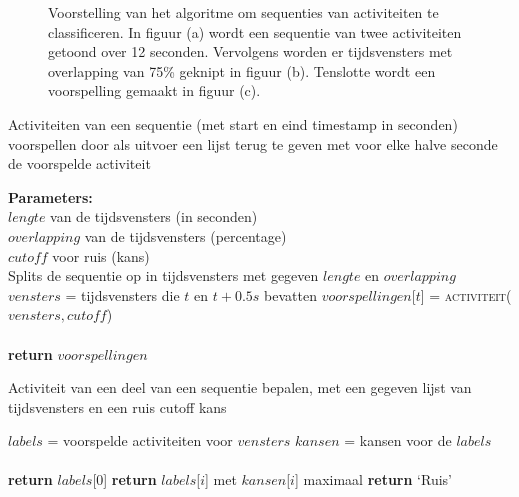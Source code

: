 \documentclass{article}
\begin{document}
\begin{figure}[h]
\begin{subfigure}[b]{.90\linewidth}
\end{subfigure}
  \caption{Voorstelling van het algoritme om sequenties van activiteiten te classificeren. In figuur (a) wordt een sequentie van twee activiteiten getoond over 12 seconden. Vervolgens worden er tijdsvensters met overlapping van 75\% geknipt in figuur (b). Tenslotte wordt een voorspelling gemaakt in figuur (c).}\label{fig:algoritme}

\end{figure}


\begin{algorithm}
  \caption{Activiteiten van een sequentie (met start en eind timestamp in seconden) voorspellen door als uitvoer een lijst terug te geven met voor elke halve seconde de voorspelde activiteit}
  \label{alg:sequentie}
  \begin{algorithmic}[0]
    \State \textbf{Parameters:}\\
    $lengte$ van de tijdsvensters (in seconden) \\
    $overlapping$ van de tijdsvensters (percentage) \\
    $cutoff$ voor ruis (kans) \\
    \State Splits de sequentie op in tijdsvensters met gegeven $lengte$ en $overlapping$ \\
      \State $vensters$ = tijdsvensters die $t$ en $t+0.5s$ bevatten
      \State $voorspellingen$[$t$] = \textsc{activiteit}($vensters,cutoff$) \\
    \EndFor \\
    \State \textbf{return} $voorspellingen$
  \end{algorithmic}
\end{algorithm}

\begin{algorithm}
  \caption{Activiteit van een deel van een sequentie bepalen, met een gegeven lijst van tijdsvensters en een ruis cutoff kans}
  \label{alg:deel}
  \begin{algorithmic}[0]
      \State $labels$ = voorspelde activiteiten voor $vensters$ 
      \State $kansen$ = kansen voor de $labels$ \\
       \\
        \State \textbf{return} $labels$[$0$]
      \Else
          \State \textbf{return} $labels$[$i$] met $kansen$[$i$] maximaal
        \Else
          \State \textbf{return} `Ruis'
        \EndIf
      \EndIf
    \EndProcedure
  \end{algorithmic}
\end{algorithm}
\end{document}
